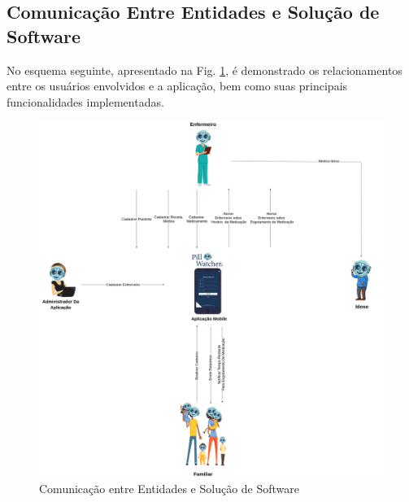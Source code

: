 \subsection{Comunicação Entre Entidades e Solução de Software}
No esquema seguinte, apresentado na Fig. \ref{fig:Communication_between_entities}, é demonstrado os relacionamentos entre os usuários envolvidos e a aplicação, bem como suas principais funcionalidades implementadas.
\begin{figure}[H]
    \centering
    \includegraphics[width=\textwidth]{figuras/software/rich_picture/comu_entre_entidades.png}
    \caption{Comunicação entre Entidades e Solução de Software}
    \label{fig:Communication_between_entities}
\end{figure}